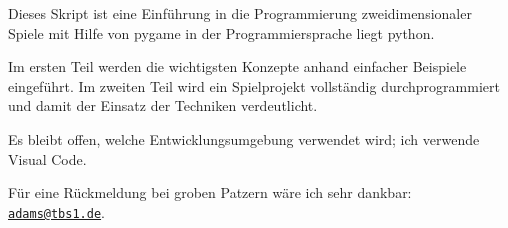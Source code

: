 Dieses Skript ist eine Einführung in die Programmierung zweidimensionaler Spiele mit Hilfe von \Gls{pygame} in der Programmiersprache liegt \Gls{python}. 

Im ersten Teil werden die wichtigsten Konzepte anhand einfacher Beispiele eingeführt. Im zweiten Teil wird ein Spielprojekt vollständig durchprogrammiert und damit der Einsatz der Techniken verdeutlicht.

Es bleibt offen, welche Entwicklungsumgebung verwendet wird; ich verwende Visual Code.

Für eine Rückmeldung bei groben Patzern wäre ich sehr dankbar: \href{mailto:adams@tbs1.de}{\nolinkurl{adams@tbs1.de}}.



